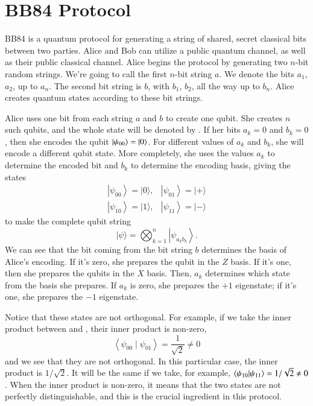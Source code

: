 \section{BB84 Protocol}
\label{sec:bb84-protocol}

BB84 is a quantum protocol for generating a string of shared, secret classical bits between two parties.  Alice and Bob can utilize a public quantum channel, as well as their public classical channel.  Alice begins the protocol by generating two $n$-bit random strings. We're going to call the first $n$-bit string $a$.  We denote the bits $a_1$, $a_2$, up to $a_n$. The second bit string is $b$, with $b_1$, $b_2$, all the way up to $b_n$.  Alice creates quantum states according to these bit strings.

Alice uses one bit from each string $a$ and $b$ to create one qubit. She creates $n$ such qubits, and the whole state will be denoted by \ket{\psi}. If her bits $a_k = 0$ and $b_k = 0$, then she encodes the qubit $\left| \psi_{00} \right\rangle = \left| 0 \right\rangle$.  For different values of $a_k$ and $b_k$, she will encode a different qubit state.  More completely, she uses the values $a_k$ to determine the encoded bit and $b_k$ to determine the encoding basis, giving the states
\begin{equation}
\begin{array}{ll}
\left|\psi_{00}\right\rangle=|0\rangle, & \left|\psi_{01}\right\rangle=|+\rangle \\
\left|\psi_{10}\right\rangle=|1\rangle, & \left|\psi_{11}\right\rangle=|-\rangle
\end{array}
\end{equation}
to make the complete qubit string
\begin{equation}
|\psi\rangle=\bigotimes_{k=1}^n\left|\psi_{a_k b_k}\right\rangle.
\end{equation}
We can see that the bit coming from the bit string $b$ determines the basis of Alice's encoding. If it's zero, she prepares the qubit in the $Z$ basis. If it's one, then she prepares the qubits in the $X$ basis. Then, $a_k$ determines which state from the basis she prepares. If $a_k$ is zero, she prepares the $+1$ eigenstate; if it's one, she prepares the $-1$ eigenstate.

Notice that these states are not orthogonal. For example, if we take the inner product between  and , their inner product is non-zero,
\begin{equation}
\left\langle\psi_{00} \mid \psi_{01}\right\rangle=\frac{1}{\sqrt{2}} \ne 0
\end{equation}
and we see that they are not orthogonal.
In this particular case, the inner product is $1/\sqrt{2}$. It will be the same if we take, for example, 
$\langle \psi_{10}|\psi_{11} \rangle = 1/\sqrt{2} \ne 0$. When the inner product is non-zero, it means that the two states are not perfectly distinguishable, and this is the crucial ingredient in this protocol. 


